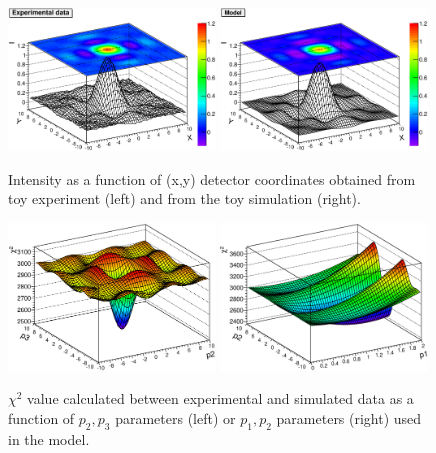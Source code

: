 \begin{figure}[!p]
  \centering
    \includegraphics[width=0.49\textwidth]{Figures/toyfit_expdata.eps}
    \includegraphics[width=0.49\textwidth]{Figures/toyfit_simdata.eps}
  \caption{Intensity as a function of (x,y) detector coordinates  obtained from 
  toy experiment (left) and from the toy simulation (right).   }
  \label{fig:toyfit_data}
  \vspace*{4mm}
    \includegraphics[width=0.49\textwidth]{Figures/toyfit_chi2_p23.eps}
    \includegraphics[width=0.49\textwidth]{Figures/toyfit_chi2_p12.eps}
  \caption{$\chi^{2}$ value calculated between experimental and simulated data
  as a function of $p_2,p_3$ parameters (left) or $p_1,p_2$ 
  parameters (right) used in the model.   }
  \label{fig:toyfit_chi2}
\end{figure}


